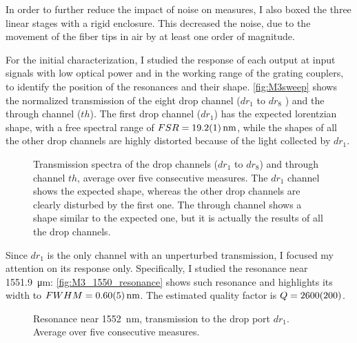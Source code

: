 In order to further reduce the impact of noise on measures, I also boxed the three linear stages with a rigid enclosure.
This decreased the noise, due to the movement of the fiber tips in air by at least one order of magnitude.

For the initial characterization, I studied the response of each output at input signals with low optical power and in the working range of the grating couplers, to identify the position of the resonances and their shape.
\autoref{fig:M3sweep} shows the normalized transmission of the eight drop channel ($dr_1$ to $dr_8$ ) and the through channel ($th$).
The first drop channel ($dr_1$) has the expected lorentzian shape, with a free spectral range of $FSR=\SI{19.2+-.1}{\nm}$, while the shapes of all the other drop channels are highly distorted because of the light collected by $dr_1$.

\begin{figure}[htbp]
	\centering
%	
%	
	
	\caption{
		Transmission spectra of the drop channels ($dr_1$ to $dr_8$) and through channel $th$, average over five consecutive measures.
		The $dr_1$ channel shows the expected shape, whereas the other drop channels are clearly disturbed by the first one.
		The through channel shows a shape similar to the expected one, but it is actually the results of all the drop channels.
	}
	\label{fig:M3sweep}
\end{figure}

Since $dr_1$ is the only channel with an unperturbed transmission, I focused my attention on its response only.
Specifically, I studied the resonance near \SI{1551.9}{\um}:%
\autoref{fig:M3_1550_resonance} shows such resonance and highlights its width to $FWHM=\SI{0.6+-0.05}{\nm}$.
The estimated quality factor is $Q=\num{2600+-200}$.

\begin{figure}[!hbtp]
	\centering
	
	\caption{
		Resonance near \SI{1552}{\nm}, transmission to the drop port $dr_1$.
		Average over five consecutive measures.
	}
	\label{fig:M3_1550_resonance}
\end{figure}

